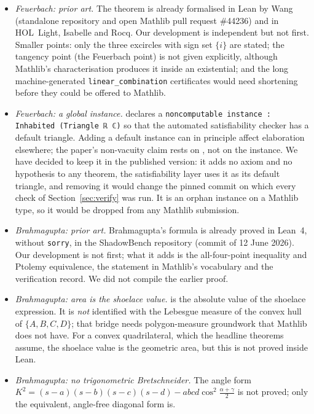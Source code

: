 \documentclass[11pt]{article}
\theoremstyle{definition}
\theoremstyle{remark}
\newcommand{\lean}[1]{\texttt{#1}}
\begin{document}
\begin{itemize}
\item \emph{Feuerbach: prior art.} The theorem is already formalised in Lean by Wang
(standalone repository and open Mathlib pull request \#44236) and in HOL~Light, Isabelle and Rocq.
Our development is independent but not first. Smaller points: only the three excircles with sign
set $\{i\}$ are stated; the tangency point (the Feuerbach point) is not given explicitly, although
Mathlib's characterisation produces it inside an existential; and the long machine-generated
\lean{linear\_combination} certificates would need shortening before they could be offered to
Mathlib.
\item \emph{Feuerbach: a global instance.}  declares a
\lean{noncomputable instance : Inhabited (Triangle ℝ ℂ)} so that the automated satisfiability
checker has a default triangle. Adding a default instance can in principle affect elaboration
elsewhere; the paper's non-vacuity claim rests on , not on the
instance. We have decided to keep it in the published version: it adds no axiom and no hypothesis
to any theorem, the satisfiability layer uses it as its default triangle, and removing it would
change the pinned commit on which every check of Section~\ref{sec:verify} was run. It is an orphan
instance on a Mathlib type, so it would be dropped from any Mathlib submission.
\item \emph{Brahmagupta: prior art.} Brahmagupta's formula is already proved in Lean~4, without
\lean{sorry}, in the ShadowBench repository (commit of 12 June 2026). Our development is not first;
what it adds is the all-four-point inequality and Ptolemy equivalence, the statement in Mathlib's
vocabulary and the verification record. We did not compile the earlier proof.
\item \emph{Brahmagupta: area is the shoelace value.}  is the absolute
value of the shoelace expression. It is \emph{not} identified with the Lebesgue measure of the
convex hull of $\{A,B,C,D\}$; that bridge needs polygon-measure groundwork that Mathlib does not
have. For a convex quadrilateral, which the headline theorems assume, the shoelace value is the
geometric area, but this is not proved inside Lean.
\item \emph{Brahmagupta: no trigonometric Bretschneider.} The angle form
$K^2=(s-a)(s-b)(s-c)(s-d)-abcd\cos^2\tfrac{\alpha+\gamma}2$ is not proved; only the equivalent,
angle-free diagonal form  is.

\end{itemize}
\end{document}

